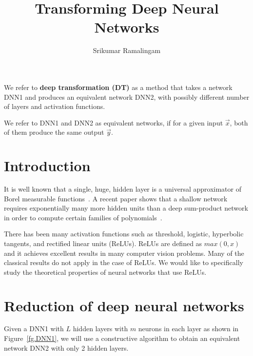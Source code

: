 \documentclass[runningheads,a4paper]{llncs}
\begin{document}
\title{Transforming Deep Neural Networks}

\author{Srikumar Ramalingam}
\maketitle

We refer to {\bf deep transformation (DT)} as a method that takes a network {\sc DNN1} and produces an equivalent network {\sc DNN2}, with possibly different number of layers and activation functions. 

\begin{definition}
We refer to {\sc DNN1} and {\sc DNN2} as equivalent networks, if for a given input $\vec{x}$, both of them produce the same output $\vec{y}$. 
\label{def.equivalent_networks}
\end{definition}

\section{Introduction}

It is well known that a single, huge, hidden layer is a universal approximator of Borel measurable functions~\cite{Hornik1989,Cybenko1989}. A recent paper shows that a shallow network requires exponentially many more hidden units than a deep sum-product network in order to compute certain families of polynomials~\cite{Delalleau2011}. 

There has been many activation functions such as threshold, logistic, hyperbolic tangents, and rectified linear units (ReLUs). ReLUs are defined as $max(0,x)$ and it achieves excellent results in many computer vision problems. Many of the classical results do not apply in the case of ReLUs. We would like to specifically study the theoretical properties of neural networks that use ReLUs. 

\section{Reduction of deep neural networks}
Given a {\sc DNN1} with $L$ hidden layers with $m$ neurons in each layer as shown in Figure~\ref{fg.DNN1}, we will use a constructive algorithm to obtain an equivalent network {\sc DNN2} with only 2 hidden layers. 
\end{document}
